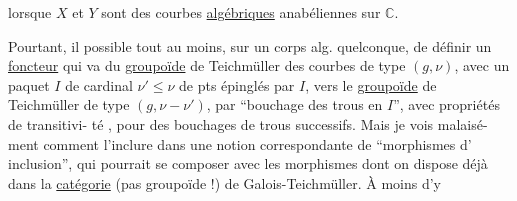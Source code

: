 lorsque $X$ et $Y$ sont des courbes \uline{algébriques}
anabéliennes sur $\mathbb C$.

Pourtant, il   possible tout au
moins, sur un corps alg.  quelconque,
de définir un \uline{foncteur} qui va du
\uline{groupoïde} de Teichmüller des
courbes de type $(g,\nu)$,  avec un
paquet  $I$ de cardinal $\nu'\leq\nu$ de
pts épinglés par $I$, vers le \uline{groupoïde}
de Teichmüller de type $(g,\nu-\nu')$,
par ``bouchage des trous en $I$'', 
avec  propriétés de transitivi-
té , pour des bouchages de
trous successifs. Mais je vois malaisé-
ment comment l'inclure dans une
notion correspondante de ``morphismes d'
inclusion'', qui pourrait se composer
avec les morphismes dont on dispose
déjà dans la \uline{catégorie} (pas groupoïde !)
de Galois-Teichmüller. À moins d'y
